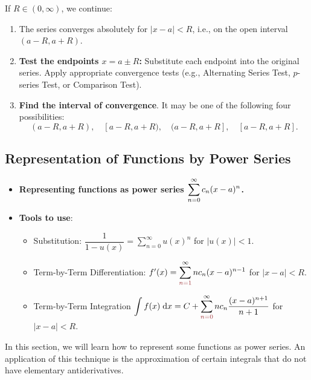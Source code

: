If $R \in (0, \infty)$,  we continue:
\begin{enumerate}[resume]
    \item The series converges absolutely for $|x - a| < R$, i.e., on the open interval $(a - R, a + R)$.

    \item \textbf{Test the endpoints $x = a \pm R$:} Substitute each endpoint into the original series. Apply appropriate convergence tests (e.g., Alternating Series Test, $p$-series Test, or Comparison Test).
    
    \item \textbf{Find the interval of convergence}. It may be one of the following four possibilities: 
    \[(a - R, a + R), \quad  [a - R, a + R), \quad (a - R, a + R], \quad  [a - R, a + R].\]
\end{enumerate}

\subsection{Representation of Functions by Power Series} 

\begin{center}
\begin{tcolorbox}
    \begin{itemize}
        \item \textbf{Representing functions as power series $\displaystyle\sum_{n=0}^\infty c_n (x-a)^n$.}
        \item \textbf{Tools to use}: \begin{itemize}
            \item Substitution: $\dfrac{1}{1-u(x)} = \sum_{n=0}^\infty u(x)^n$ for $|u(x)| < 1$.
            \item Term-by-Term Differentiation: $f'(x) = \dsum_{\red{n=1}}^\infty n c_n (x-a)^{n-1}$ for $|x-a| < R$.
            \item Term-by-Term Integration
            $\dint f(x) \dd x = C + \dsum_{\red{n=0}}^\infty n c_n \dfrac{(x-a)^{n+1}}{n+1}$ for $|x-a| < R$. 
        \end{itemize}
    \end{itemize}
\end{tcolorbox}
\end{center}

In this section, we will learn how to represent some functions as power series. An application of this technique is the approximation of certain integrals that do not have elementary antiderivatives.

